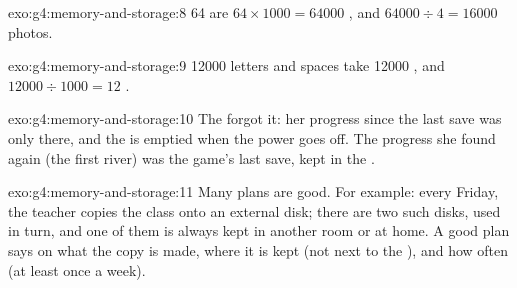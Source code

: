 \begin{solution}{exo:g4:memory-and-storage:8}
64  are $64 \times \num{1000} = \num{64000}$ , and
$\num{64000} \div 4 = \num{16000}$ photos.
\end{solution}

\begin{solution}{exo:g4:memory-and-storage:9}
\num{12000} letters and spaces take \num{12000} , and
$\num{12000} \div \num{1000} = 12$ .
\end{solution}

\begin{solution}{exo:g4:memory-and-storage:10}
The  forgot it: her progress since the last save was only there, and the
 is emptied when the power goes off. The progress she found again (the
first river) was the game's last save, kept in the .
\end{solution}

\begin{solution}{exo:g4:memory-and-storage:11}
Many plans are good. For example: every Friday, the teacher copies the class
 onto an external disk; there are two such disks, used in turn, and one
of them is always kept in another room or at home. A good plan says on what
the copy is made, where it is kept (not next to the ), and how often
(at least once a week).
\end{solution}
